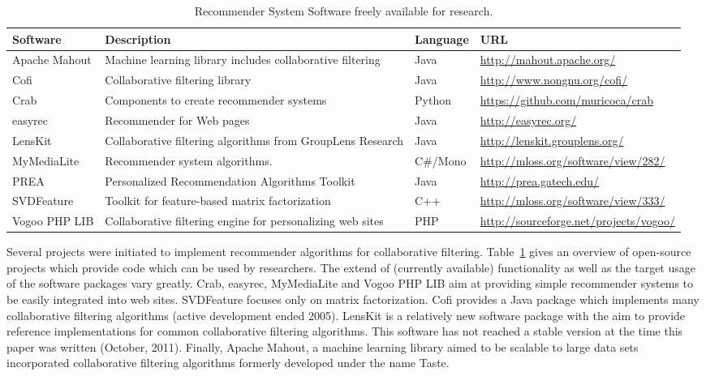 \documentclass[nojss]{jss}
\begin{document}
\begin{table}
\begin{tabular}{|p{1.9cm}|p{3cm}|l|l|}
\hline
{\bf Software} & {\bf Description} & {\bf Language} & {\bf URL} \\
\hline
\hline
Apache Mahout & Machine learning library includes collaborative filtering &Java& \small\url{http://mahout.apache.org/}\\
\hline
Cofi & Collaborative filtering library & Java & \small\url{http://www.nongnu.org/cofi/}\\
\hline
Crab & Components to create recommender systems & Python & \small\url{https://github.com/muricoca/crab}\\
\hline
easyrec & Recommender for Web pages & Java & \small\url{http://easyrec.org/}\\
\hline
LensKit & Collaborative filtering algorithms from GroupLens Research & Java & \small\url{http://lenskit.grouplens.org/}\\
\hline
MyMediaLite & Recommender system algorithms. & C\#/Mono & \small\url{http://mloss.org/software/view/282/}\\
\hline
PREA & Personalized Recommendation Algorithms Toolkit & Java &  \url{http://prea.gatech.edu/}\\
\hline
SVDFeature & Toolkit for feature-based matrix factorization& C++ & \small\url{http://mloss.org/software/view/333/}\\
\hline
Vogoo PHP LIB & Collaborative filtering engine for personalizing web sites & PHP & \small\url{http://sourceforge.net/projects/vogoo/} \\

\hline
\end{tabular}
\caption{Recommender System Software freely available for research.}
\label{tab:software}
\end{table}

Several projects were initiated
to implement recommender algorithms for collaborative filtering. 
Table~\ref{tab:software} gives an overview of open-source projects
which provide code which can be used by researchers.
The extend of (currently available) functionality as well as the target 
usage of the software packages vary greatly. 
Crab, easyrec, MyMediaLite and Vogoo PHP LIB aim at providing simple 
recommender systems to be easily integrated into web sites. 
SVDFeature focuses only on matrix factorization. 
Cofi provides a Java package which implements many 
collaborative filtering algorithms (active development ended 2005). 
LensKit is a relatively new software package with the aim
to provide reference implementations for common collaborative 
filtering algorithms. This software has not reached a stable version
at the time this paper was written (October, 2011).
Finally, Apache Mahout, a machine learning 
library aimed to be scalable to large data sets incorporated
collaborative filtering algorithms formerly developed under the 
name Taste. 
\end{document}

